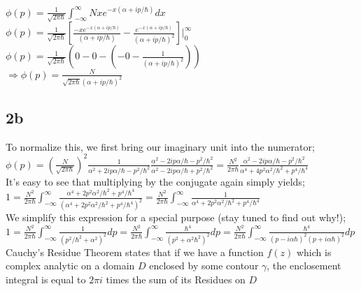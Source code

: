 \documentclass{article}
\begin{document}
$\phi(p)=\frac{1}{\sqrt{2\pi\hbar}}{\displaystyle \int_{-\infty}^{\infty} }Nxe^{-x(\alpha+ip/\hbar)}dx$\\

$\phi(p)=\frac{1}{\sqrt{2\pi\hbar}}[\frac{-xe^{-x(\alpha+ip/\hbar)}}{(\alpha+ip/\hbar)}-\frac{e^{-x(\alpha+ip/\hbar)}}{(\alpha+ip/\hbar)^2}]|_0^\infty$\\

$\phi(p)=\frac{1}{\sqrt{2\pi\hbar}}(0-0-(-0-\frac{1}{(\alpha+ip/\hbar)^2}))$\\

$\Rightarrow \phi(p)=\frac{N}{\sqrt{2\pi\hbar}(\alpha+ip/\hbar)^2}$\\

\subsection*{2b}

To normalize this, we first bring our imaginary unit into the numerator;\\

$\phi(p)=(\frac{N}{\sqrt{2\pi\hbar}})^2\frac{1}{\alpha^2+2ip\alpha/\hbar-p^2/\hbar^2}\frac{\alpha^2-2ip\alpha/\hbar-p^2/\hbar^2}{\alpha^2-2ip\alpha/\hbar+p^2/\hbar^2}=\frac{N^2}{2\pi\hbar}\frac{\alpha^2-2ip\alpha/\hbar-p^2/\hbar^2}{\alpha^4+4p^2\alpha^2/\hbar^2+p^4/\hbar^4}$\\

It's easy to see that multiplying by the conjugate again simply yields;\\

$1=\frac{N^2}{2\pi\hbar}{\displaystyle \int_{-\infty}^{\infty} }\frac{\alpha^4+2p^2\alpha^2/\hbar^2+p^4/\hbar^4}{(\alpha^4+2p^2\alpha^2/\hbar^2+p^4/\hbar^4)^2}=\frac{N^2}{2\pi\hbar}{\displaystyle \int_{-\infty}^{\infty} }\frac{1}{\alpha^4+2p^2\alpha^2/\hbar^2+p^4/\hbar^4}$\\

We simplify this expression for a special purpose (stay tuned to find out why!);\\ 

$1=\frac{N^2}{2\pi\hbar}{\displaystyle \int_{-\infty}^{\infty} } \frac{1}{(p^2/\hbar^2+\alpha^2)^2}dp=\frac{N^2}{2\pi\hbar}{\displaystyle \int_{-\infty}^{\infty} } \frac{\hbar^4}{(p^2+\alpha^2\hbar^2)^2}dp=\frac{N^2}{2\pi\hbar}{\displaystyle \int_{-\infty}^{\infty} } \frac{\hbar^4}{(p-i\alpha\hbar)^2(p+i\alpha\hbar)^2}dp$\\
\linebreak
%
Cauchy's Residue Theorem states that if we have a function $f(z)$ which is complex analytic on a domain $D$ enclosed by some contour $\gamma$, the enclosement integral is equal to $2\pi i$ times the sum of its Residues on $D$\\
\end{document}
